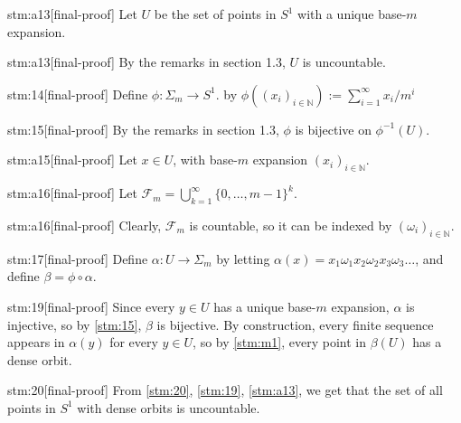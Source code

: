 \begin{stm}{stm:a13}[final-proof]
Let $U$ be the set of points in $S^1$ with a unique base-$m$ expansion. 
\end{stm}

\begin{stm}{stm:a13}[final-proof]
By the remarks in section 1.3, $U$ is uncountable.
\end{stm}

\begin{stm}{stm:14}[final-proof]
Define $\phi : \Sigma_m \to S^1$. by $\phi((x_i)_{i \in \mathbb{N}}) := \sum_{i=1}^\infty x_i / m^i$
\end{stm}

\begin{stm}{stm:15}[final-proof]
By the remarks in section 1.3, $\phi$ is bijective on $\phi^{-1}(U)$.
\end{stm}{}

\begin{stm}{stm:a15}[final-proof]
Let $x \in U$, with base-$m$ expansion $(x_i)_{i \in \mathbb{N}}$.
\end{stm}

\begin{stm}{stm:a16}[final-proof]
Let $\mathcal{F}_m = \bigcup_{k=1}^\infty \{0, \dots, m-1\}^k$.
\end{stm}

\begin{stm}{stm:a16}[final-proof]
Clearly, $\mathcal{F}_m$ is countable, so it can be indexed by $(\omega_i)_{i \in \mathbb{N}}$.
\end{stm}

\begin{stm}{stm:17}[final-proof]
Define $\alpha : U \to \Sigma_m$ by letting $\alpha(x) = x_1 \omega_1 x_2 \omega_2 x_3 \omega_3 \dots$, and define $\beta = \phi \circ \alpha$.
\end{stm}

\begin{stm}{stm:19}[final-proof]
Since every $y \in U$ has a unique base-$m$ expansion, $\alpha$ is injective, so by \ref{stm:15}, $\beta$ is bijective. By construction, every finite sequence appears in $\alpha(y)$ for every $y \in U$, so by \ref{stm:m1}, every point in $\beta(U)$ has a dense orbit.
\end{stm}

\begin{stm}{stm:20}[final-proof]
From \ref{stm:20}, \ref{stm:19}, \ref{stm:a13}, we get that the set of all points in $S^1$ with dense orbits is uncountable.
\end{stm}
